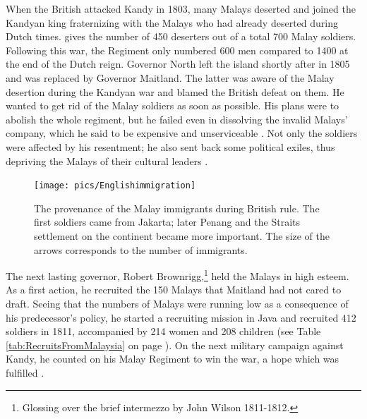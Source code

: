 When the British attacked Kandy in 1803, many Malays deserted and
joined the Kandyan king fraternizing with the Malays who had
already deserted during Dutch times. \citet[166]{Codrington1926} gives the number of 450 deserters out of a total 700 Malay soldiers. Following this war, the
Regiment only numbered 600 men \citep[72]{Hussainmiya1990}
compared to 1400 at the end of the Dutch reign. Governor North
left the island shortly after in 1805 and was replaced by Governor
Maitland. The latter was aware of the Malay desertion during the
Kandyan war and blamed the British defeat on them. He wanted to
get rid of the Malay soldiers as soon as possible. His plans were to abolish the whole regiment, but he failed even in dissolving  the invalid Malays' company, which he said to be expensive and unserviceable \citep[67,78]{Hussainmiya1990}. Not only the soldiers were affected by his resentment; he also sent back some political exiles, thus depriving the Malays of their cultural leaders \citep[79]{Hussainmiya1990}.





\begin{figure}
\centering
	\texttt{[image: pics/Englishimmigration]}
  \caption[Provenance of the Malay immigrants during British rule]{The provenance of the Malay immigrants during   British rule.  The first soldiers came from Jakarta; later Penang and the Straits settlement on the continent became more important. The size of the arrows corresponds to the number of immigrants.}
 \label{fig:provenanceBritish}
\end{figure}

The next lasting governor, Robert Brownrigg,\footnote{Glossing over the brief intermezzo by John Wilson 1811-1812.} held the Malays in high esteem. As a first action, he recruited the 150 Malays that Maitland had not cared to draft. Seeing that the numbers of Malays were running low as a consequence of his predecessor's policy, he started a recruiting mission in Java and recruited 412 soldiers in 1811, accompanied by 214 women and 208 children (see Table \ref{tab:RecruitsFromMalaysia} on page \pageref{tab:RecruitsFromMalaysia}). On the next military campaign against Kandy, he counted on his Malay Regiment to win the war, a hope which was fulfilled \citep[68,81f]{Hussainmiya1990}.

